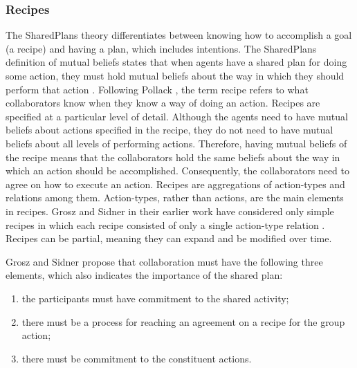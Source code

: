 \documentclass[12pt]{report}
\begin{document}
\subsubsection{Recipes}
\label{sec:recipe}

The SharedPlans theory differentiates between knowing how to accomplish a goal
(a recipe) and having a plan, which includes intentions. The SharedPlans
definition of mutual beliefs states that when agents have a shared plan for
doing some action, they must hold mutual beliefs about the way in which they
should perform that action \cite{grosz:collaboration,grosz:plans-discourse}.
Following Pollack \cite{pollack:plan-mental-attitudes}, the term recipe refers
to what collaborators know when they know a way of doing an action. Recipes are
specified at a particular level of detail. Although the agents need to have
mutual beliefs about actions specified in the recipe, they do not need to have
mutual beliefs about all levels of performing actions. Therefore, having mutual
beliefs of the recipe means that the collaborators hold the same beliefs
about the way in which an action should be accomplished. Consequently, the
collaborators need to agree on how to execute an action. Recipes are
aggregations of action-types and relations among them. Action-types, rather than
actions, are the main elements in recipes. Grosz and Sidner in their earlier
work \cite{grosz:plans-discourse} have considered only simple recipes in which
each recipe consisted of only a single action-type relation
\cite{lochbaum:plan-models}. Recipes can be partial, meaning they can expand and
be modified over time.

Grosz and Sidner propose that collaboration must have the following three
elements, which also indicates the importance of the shared plan:

\begin{enumerate}
  \item the participants must have commitment to the shared activity;
  \item there must be a process for reaching an agreement on a recipe for the
  group action;
  \item there must be commitment to the constituent actions. 
\end{enumerate}
\end{document}
